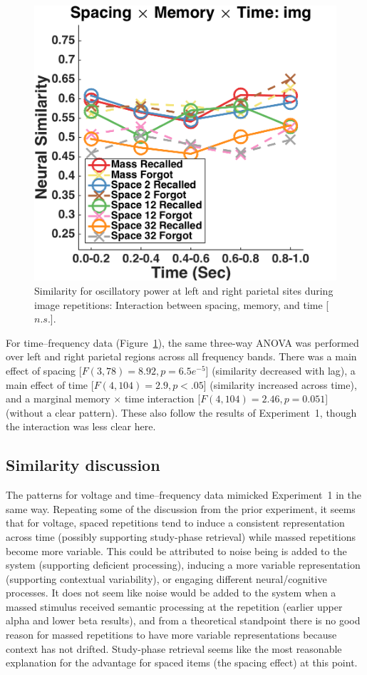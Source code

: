 \begin{figure}[H]
  \centering
  \includegraphics[width=.40\textwidth]{./figs/exp2/similarity_spacXmemXtime_img_pow_LPSRPS_0to200_200to400_400to600_600to800_800to1000_kaiser_cosine}
  \caption{Similarity for oscillatory power at left and right parietal sites during image repetitions: Interaction between spacing, memory, and time [$n.s.$].}
  \label{fig:s2_sim_pow_spacXmemXtime}
\end{figure}

For time--frequency data (Figure~\ref{fig:s2_sim_pow_spacXmemXtime}), the same three-way ANOVA was performed over left and right parietal regions across all frequency bands.
There was a main effect of spacing [$F(3,78)=8.92, p=6.5e^{-5}$] (similarity decreased with lag), a main effect of time [$F(4,104)=2.9, p<.05$] (similarity increased across time), and a marginal memory $\times$ time interaction [$F(4,104)=2.46, p=0.051$] (without a clear pattern).  These also follow the results of Experiment~1, though the interaction was less clear here.

\subsection{Similarity discussion}

The patterns for voltage and time--frequency data mimicked Experiment~1 in the same way.  Repeating some of the discussion from the prior experiment, it seems that for voltage, spaced repetitions tend to induce a consistent representation across time (possibly supporting study-phase retrieval) while massed repetitions become more variable.  This could be attributed to noise being is added to the system (supporting deficient processing), inducing a more variable representation (supporting contextual variability), or engaging different neural/cognitive processes.  It does not seem like noise would be added to the system when a massed stimulus received semantic processing at the repetition (earlier upper alpha and lower beta results), and from a theoretical standpoint there is no good reason for massed repetitions to have more variable representations because context has not drifted.  Study-phase retrieval seems like the most reasonable explanation for the advantage for spaced items (the spacing effect) at this point.

